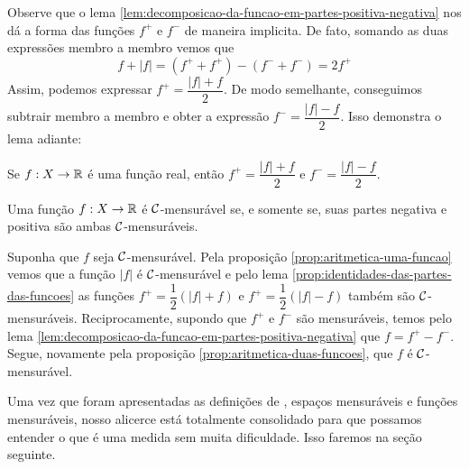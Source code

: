 Observe que o lema \ref{lem:decomposicao-da-funcao-em-partes-positiva-negativa} nos dá a forma das funções $f^+$ e $f^-$ de maneira implicita.
De fato, somando as duas expressões membro a membro vemos que 
$$f + |f| = (f^+ + f^+) - (f^- + f^-) = 2f^+$$
Assim, podemos expressar $f^+ = \dfrac{|f| + f}{2}$.
De modo semelhante, conseguimos subtrair membro a membro e obter a expressão $f^- = \dfrac{|f| - f}{2}$. 
Isso demonstra o lema adiante:

    \begin{lemma}
    \label{prop:identidades-das-partes-das-funcoes}
        Se $f: X \to \mathbb{R}$ é uma função real, então $f^+ = \dfrac{|f| + f}{2}$ e $f^- = \dfrac{|f| - f}{2}$.
    \end{lemma}
    \begin{theorem}
        Uma função $f: X \to \mathbb{R}$ é $\operatorname{\mathcal{C}}$-mensurável se, e somente se, suas partes negativa e positiva são ambas $\operatorname{\mathcal{C}}$-mensuráveis. 
    \end{theorem}

    \begin{prova}
        Suponha que $f$ seja $\operatorname{\mathcal{C}}$-mensurável.
        Pela proposição \ref{prop:aritmetica-uma-funcao} vemos que a função $|f|$ é $\operatorname{\mathcal{C}}$-mensurável e pelo lema \ref{prop:identidades-das-partes-das-funcoes} as funções $f^+ = \dfrac{1}{2}(|f| + f)$ e $f^+ = \dfrac{1}{2}(|f| - f)$ também são $\operatorname{\mathcal{C}}$-mensuráveis.
        Reciprocamente, supondo que $f^+$ e $f^-$ são mensuráveis, temos pelo lema \ref{lem:decomposicao-da-funcao-em-partes-positiva-negativa} que
        $f = f^+ - f^-$. Segue, novamente pela proposição \ref{prop:aritmetica-duas-funcoes}, que $f$ é $\operatorname{\mathcal{C}}$-mensurável. 
    \end{prova}

Uma vez que foram apresentadas as definições de \sigal\hspace{-0.1cm}, espaços mensuráveis e funções mensuráveis, nosso alicerce está totalmente consolidado para que possamos entender o que é uma medida sem muita dificuldade.
Isso faremos na seção seguinte.
